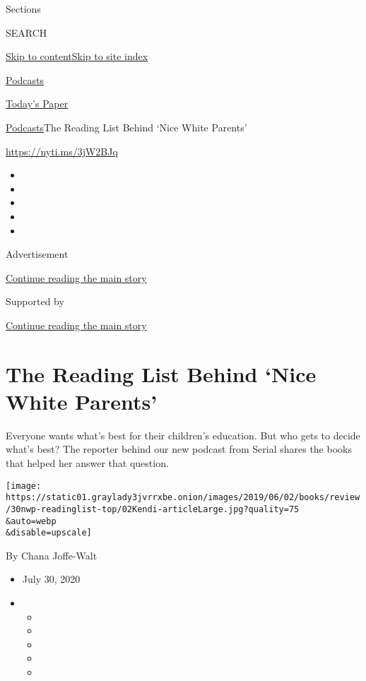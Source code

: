 Sections

SEARCH

\protect\hyperlink{site-content}{Skip to
content}\protect\hyperlink{site-index}{Skip to site index}

\href{https://www.nytimes3xbfgragh.onion/spotlight/podcasts}{Podcasts}

\href{https://myaccount.nytimes3xbfgragh.onion/auth/login?response_type=cookie\&client_id=vi}{}

\href{https://www.nytimes3xbfgragh.onion/section/todayspaper}{Today's
Paper}

\href{/spotlight/podcasts}{Podcasts}\textbar{}The Reading List Behind
`Nice White Parents'

\url{https://nyti.ms/3jW2BJq}

\begin{itemize}
\item
\item
\item
\item
\item
\end{itemize}

Advertisement

\protect\hyperlink{after-top}{Continue reading the main story}

Supported by

\protect\hyperlink{after-sponsor}{Continue reading the main story}

\hypertarget{the-reading-list-behind-nice-white-parents}{%
\section{The Reading List Behind `Nice White
Parents'}\label{the-reading-list-behind-nice-white-parents}}

Everyone wants what's best for their children's education. But who gets
to decide what's best? The reporter behind our new podcast from Serial
shares the books that helped her answer that question.

\texttt{[image: https://static01.graylady3jvrrxbe.onion/images/2019/06/02/books/review/30nwp-readinglist-top/02Kendi-articleLarge.jpg?quality=75\\\&auto=webp\\\&disable=upscale]}

By Chana Joffe-Walt

\begin{itemize}
\item
  July 30, 2020
\item
  \begin{itemize}
  \item
  \item
  \item
  \item
  \item
  \end{itemize}
\end{itemize}

